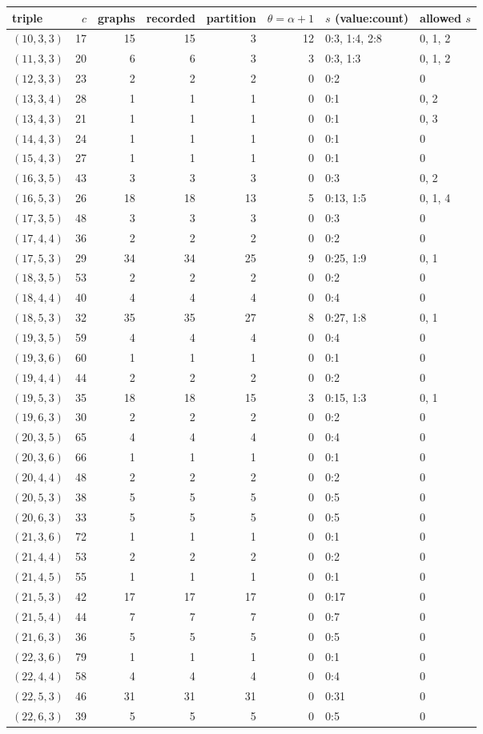 \begin{tabular}{lrrrrrll}
\toprule
triple & $c$ & graphs & recorded & partition & $\theta=\alpha+1$ & $s$ (value:count) & allowed $s$ \\
\midrule
$(10,3,3)$ & 17 & 15 & 15 & 3 & 12 & 0:3, 1:4, 2:8 & 0, 1, 2 \\
$(11,3,3)$ & 20 & 6 & 6 & 3 & 3 & 0:3, 1:3 & 0, 1, 2 \\
$(12,3,3)$ & 23 & 2 & 2 & 2 & 0 & 0:2 & 0 \\
$(13,3,4)$ & 28 & 1 & 1 & 1 & 0 & 0:1 & 0, 2 \\
$(13,4,3)$ & 21 & 1 & 1 & 1 & 0 & 0:1 & 0, 3 \\
$(14,4,3)$ & 24 & 1 & 1 & 1 & 0 & 0:1 & 0 \\
$(15,4,3)$ & 27 & 1 & 1 & 1 & 0 & 0:1 & 0 \\
$(16,3,5)$ & 43 & 3 & 3 & 3 & 0 & 0:3 & 0, 2 \\
$(16,5,3)$ & 26 & 18 & 18 & 13 & 5 & 0:13, 1:5 & 0, 1, 4 \\
$(17,3,5)$ & 48 & 3 & 3 & 3 & 0 & 0:3 & 0 \\
$(17,4,4)$ & 36 & 2 & 2 & 2 & 0 & 0:2 & 0 \\
$(17,5,3)$ & 29 & 34 & 34 & 25 & 9 & 0:25, 1:9 & 0, 1 \\
$(18,3,5)$ & 53 & 2 & 2 & 2 & 0 & 0:2 & 0 \\
$(18,4,4)$ & 40 & 4 & 4 & 4 & 0 & 0:4 & 0 \\
$(18,5,3)$ & 32 & 35 & 35 & 27 & 8 & 0:27, 1:8 & 0, 1 \\
$(19,3,5)$ & 59 & 4 & 4 & 4 & 0 & 0:4 & 0 \\
$(19,3,6)$ & 60 & 1 & 1 & 1 & 0 & 0:1 & 0 \\
$(19,4,4)$ & 44 & 2 & 2 & 2 & 0 & 0:2 & 0 \\
$(19,5,3)$ & 35 & 18 & 18 & 15 & 3 & 0:15, 1:3 & 0, 1 \\
$(19,6,3)$ & 30 & 2 & 2 & 2 & 0 & 0:2 & 0 \\
$(20,3,5)$ & 65 & 4 & 4 & 4 & 0 & 0:4 & 0 \\
$(20,3,6)$ & 66 & 1 & 1 & 1 & 0 & 0:1 & 0 \\
$(20,4,4)$ & 48 & 2 & 2 & 2 & 0 & 0:2 & 0 \\
$(20,5,3)$ & 38 & 5 & 5 & 5 & 0 & 0:5 & 0 \\
$(20,6,3)$ & 33 & 5 & 5 & 5 & 0 & 0:5 & 0 \\
$(21,3,6)$ & 72 & 1 & 1 & 1 & 0 & 0:1 & 0 \\
$(21,4,4)$ & 53 & 2 & 2 & 2 & 0 & 0:2 & 0 \\
$(21,4,5)$ & 55 & 1 & 1 & 1 & 0 & 0:1 & 0 \\
$(21,5,3)$ & 42 & 17 & 17 & 17 & 0 & 0:17 & 0 \\
$(21,5,4)$ & 44 & 7 & 7 & 7 & 0 & 0:7 & 0 \\
$(21,6,3)$ & 36 & 5 & 5 & 5 & 0 & 0:5 & 0 \\
$(22,3,6)$ & 79 & 1 & 1 & 1 & 0 & 0:1 & 0 \\
$(22,4,4)$ & 58 & 4 & 4 & 4 & 0 & 0:4 & 0 \\
$(22,5,3)$ & 46 & 31 & 31 & 31 & 0 & 0:31 & 0 \\
$(22,6,3)$ & 39 & 5 & 5 & 5 & 0 & 0:5 & 0 \\
\bottomrule
\end{tabular}
